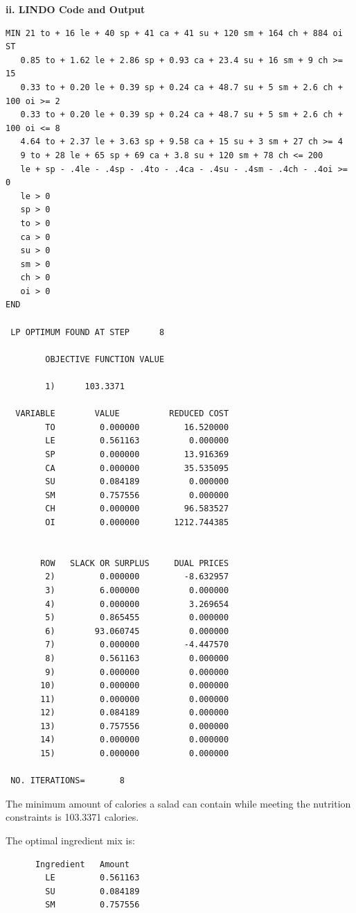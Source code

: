 \documentclass[paper=a4, fontsize=11pt]{scrartcl} %
\numberwithin{equation}{section} %
\numberwithin{figure}{section} %
\numberwithin{table}{section} %
\begin{document}
    \textbf{ii. LINDO Code and Output}
    \begin{verbatim}
MIN 21 to + 16 le + 40 sp + 41 ca + 41 su + 120 sm + 164 ch + 884 oi
ST
   0.85 to + 1.62 le + 2.86 sp + 0.93 ca + 23.4 su + 16 sm + 9 ch >= 15
   0.33 to + 0.20 le + 0.39 sp + 0.24 ca + 48.7 su + 5 sm + 2.6 ch + 100 oi >= 2
   0.33 to + 0.20 le + 0.39 sp + 0.24 ca + 48.7 su + 5 sm + 2.6 ch + 100 oi <= 8
   4.64 to + 2.37 le + 3.63 sp + 9.58 ca + 15 su + 3 sm + 27 ch >= 4
   9 to + 28 le + 65 sp + 69 ca + 3.8 su + 120 sm + 78 ch <= 200
   le + sp - .4le - .4sp - .4to - .4ca - .4su - .4sm - .4ch - .4oi >= 0
   le > 0
   sp > 0
   to > 0
   ca > 0
   su > 0
   sm > 0
   ch > 0
   oi > 0
END

 LP OPTIMUM FOUND AT STEP      8

        OBJECTIVE FUNCTION VALUE

        1)      103.3371

  VARIABLE        VALUE          REDUCED COST
        TO         0.000000         16.520000
        LE         0.561163          0.000000
        SP         0.000000         13.916369
        CA         0.000000         35.535095
        SU         0.084189          0.000000
        SM         0.757556          0.000000
        CH         0.000000         96.583527
        OI         0.000000       1212.744385


       ROW   SLACK OR SURPLUS     DUAL PRICES
        2)         0.000000         -8.632957
        3)         6.000000          0.000000
        4)         0.000000          3.269654
        5)         0.865455          0.000000
        6)        93.060745          0.000000
        7)         0.000000         -4.447570
        8)         0.561163          0.000000
        9)         0.000000          0.000000
       10)         0.000000          0.000000
       11)         0.000000          0.000000
       12)         0.084189          0.000000
       13)         0.757556          0.000000
       14)         0.000000          0.000000
       15)         0.000000          0.000000

 NO. ITERATIONS=       8
    \end{verbatim}
    
    The minimum amount of calories a salad can contain while meeting the nutrition constraints is 103.3371 calories.

The optimal ingredient mix is:
    \begin{verbatim}
	  Ingredient   Amount
        LE         0.561163
        SU         0.084189
        SM         0.757556
    \end{verbatim}
    
\end{document}
